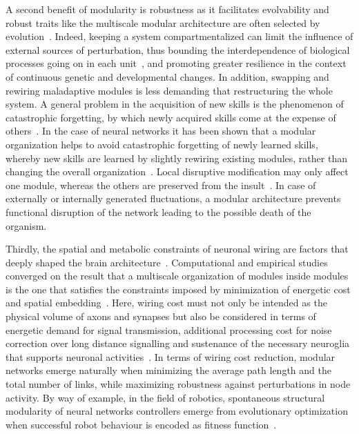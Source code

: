 A second benefit of modularity is robustness as it facilitates evolvability and robust traits like the multiscale modular architecture are often selected by evolution~\cite{kitano2004,betzel2016}.
Indeed, keeping a system compartmentalized can limit the influence of external sources of perturbation, thus bounding the interdependence of biological processes going on in each unit~\cite{kirschner1998}, and promoting greater resilience in the context of continuous genetic and developmental changes.
In addition, swapping and rewiring maladaptive modules is less demanding that restructuring the whole system.
A general problem in the acquisition of new skills is the phenomenon of catastrophic forgetting, by which newly acquired skills come at the expense of others~\cite{french1999}.
In the case of neural networks it has been shown that a modular organization helps to avoid catastrophic forgetting of newly learned skills, whereby new skills are learned by slightly rewiring existing modules, rather than changing the overall organization~\cite{ellefsen2015}.
Local disruptive modification may only affect one module, whereas the others are preserved from the insult~\cite{stam2014}.
In case of externally or internally generated fluctuations, a modular architecture prevents functional disruption of the network leading to the possible death of the organism.

Thirdly, the spatial and metabolic constraints of neuronal wiring are factors that deeply shaped the brain architecture~\cite{bullmore2012,stam2012}. Computational and empirical studies converged on the result that a multiscale organization of modules inside modules is the one that satisfies the constraints imposed by minimization of energetic cost and spatial embedding~\cite{pan2007,bullmore2012,doucet2011,betzel2017,kaiser2006}.
Here, wiring cost must not only be intended as the physical volume of axons and synapses but also be considered in terms of energetic demand for signal transmission, additional processing cost for noise correction over long distance signalling and sustenance of the necessary neuroglia that supports neuronal activities~\cite{bullmore2012}. In terms of wiring cost reduction, modular networks emerge naturally when minimizing the average path length and the total number of links, while maximizing robustness against perturbations in node activity.
By way of example, in the field of robotics, spontaneous structural modularity of neural networks controllers emerge from evolutionary optimization when successful robot behaviour is encoded as fitness function~\cite{bongard2011}.

